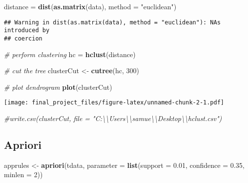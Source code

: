 \documentclass[]{article}
\newenvironment{Shaded}{\begin{snugshade}}{\end{snugshade}}
\newcommand{\KeywordTok}[1]{\textcolor[rgb]{0.13,0.29,0.53}{\textbf{#1}}}
\newcommand{\DataTypeTok}[1]{\textcolor[rgb]{0.13,0.29,0.53}{#1}}
\newcommand{\DecValTok}[1]{\textcolor[rgb]{0.00,0.00,0.81}{#1}}
\newcommand{\FloatTok}[1]{\textcolor[rgb]{0.00,0.00,0.81}{#1}}
\newcommand{\StringTok}[1]{\textcolor[rgb]{0.31,0.60,0.02}{#1}}
\newcommand{\CommentTok}[1]{\textcolor[rgb]{0.56,0.35,0.01}{\textit{#1}}}
\newcommand{\NormalTok}[1]{#1}
\begin{document}
\begin{Shaded}
\begin{Highlighting}[]
\NormalTok{distance =}\StringTok{ }\KeywordTok{dist}\NormalTok{(}\KeywordTok{as.matrix}\NormalTok{(data), }\DataTypeTok{method =} \StringTok{"euclidean"}\NormalTok{)}
\end{Highlighting}
\end{Shaded}

\begin{verbatim}
## Warning in dist(as.matrix(data), method = "euclidean"): NAs introduced by
## coercion
\end{verbatim}

\begin{Shaded}
\begin{Highlighting}[]
\CommentTok{# perform clustering}
\NormalTok{hc =}\StringTok{ }\KeywordTok{hclust}\NormalTok{(distance)}

\CommentTok{# cut the tree}
\NormalTok{clusterCut <-}\StringTok{ }\KeywordTok{cutree}\NormalTok{(hc, }\DecValTok{300}\NormalTok{)}

\CommentTok{# plot dendrogram}
\KeywordTok{plot}\NormalTok{(clusterCut)}
\end{Highlighting}
\end{Shaded}

\texttt{[image: final\_project\_files/figure-latex/unnamed-chunk-2-1.pdf]}

\begin{Shaded}
\begin{Highlighting}[]
\CommentTok{#write.csv(clusterCut, file = "C:\textbackslash{}\textbackslash{}Users\textbackslash{}\textbackslash{}samue\textbackslash{}\textbackslash{}Desktop\textbackslash{}\textbackslash{}hclust.csv")}
\end{Highlighting}
\end{Shaded}

\subsection{Apriori}\label{apriori}

\begin{Shaded}
\begin{Highlighting}[]
\NormalTok{apprules <-}\StringTok{ }\KeywordTok{apriori}\NormalTok{(tdata, }\DataTypeTok{parameter =} \KeywordTok{list}\NormalTok{(}\DataTypeTok{support =} \FloatTok{0.01}\NormalTok{, }\DataTypeTok{confidence =} \FloatTok{0.35}\NormalTok{, }\DataTypeTok{minlen =} \DecValTok{2}\NormalTok{))}
\end{Highlighting}
\end{Shaded}
\end{document}
